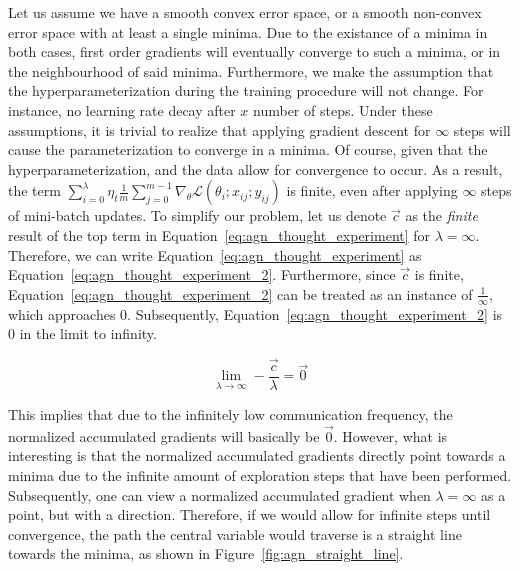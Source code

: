 Let us assume we have a smooth convex error space, or a smooth non-convex error space with at least a single minima. Due to the existance of a minima in both cases, first order gradients will eventually converge to such a minima, or in the neighbourhood of said minima. Furthermore, we  make the assumption that the hyperparameterization during the training procedure will not change. For instance, no learning rate decay after $x$ number of steps. Under these assumptions, it is trivial to realize that applying gradient descent for $\infty$ steps will cause the parameterization to converge in a minima. Of course, given that the hyperparameterization, and the data allow for convergence to occur. As a result, the term $\sum_{i = 0}^\lambda \eta_t \frac{1}{m}\sum_{j = 0}^{m - 1} \nabla_\theta \mathcal{L}(\theta_i;x_{ij};y_{ij})$ is finite, even after applying $\infty$ steps of mini-batch updates. To simplify our problem, let us denote $\vec{c}$ as the \emph{finite} result of the top term in Equation~\ref{eq:agn_thought_experiment} for $\lambda = \infty$. Therefore, we can write Equation~\ref{eq:agn_thought_experiment} as Equation~\ref{eq:agn_thought_experiment_2}. Furthermore, since $\vec{c}$ is finite, Equation~\ref{eq:agn_thought_experiment_2} can be treated as an instance of $\frac{1}{\infty}$, which approaches 0. Subsequently, Equation~\ref{eq:agn_thought_experiment_2} is 0 in the limit to infinity.

\begin{equation}
  \label{eq:agn_thought_experiment_2}
  \lim_{\lambda \to \infty} - \frac{\vec{c}}{\lambda} = \vec{0}
\end{equation}

This implies that due to the infinitely low communication frequency, the normalized accumulated gradients will basically be $\vec{0}$. However, what is interesting is that the normalized accumulated gradients directly point towards a minima due to the infinite amount of exploration steps that have been performed. Subsequently, one can view a normalized accumulated gradient when $\lambda = \infty$ as a point, but with a direction. Therefore, if we would allow for infinite steps until convergence, the path the central variable would traverse is a straight line towards the minima, as shown in Figure~\ref{fig:agn_straight_line}.

